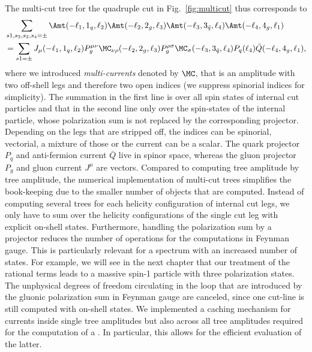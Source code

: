 The multi-cut tree for the quadruple cut in Fig.~\ref{fig:multicut} thus corresponds to 
\begin{align}
\begin{split}
  &\sum_{s1,s_2,s_3,s_4=\pm}\Amt(-\ell_1,1_q,\ell_2)\Amt(-\ell_2,2_g,\ell_3)\Amt(-\ell_3,3_{\bar{q}},\ell_4)\Amt(-\ell_4,4_g,\ell_1)\\
  &=\sum_{s1=\pm}J_\mu(-\ell_1,1_q,\ell_2)P_g^{\mu\nu}\MC_{\nu\rho}(-\ell_2,2_g,\ell_3)P_g^{\rho\sigma}\MC_{\sigma}(-\ell_3,3_{\bar{q}},\ell_4)P_q(\ell_4)\bar{Q}(-\ell_4,4_{g},\ell_1),
\end{split}
\end{align}
where we introduced \textit{multi-currents} denoted by $\MC$, that is an amplitude
with two off-shell legs and therefore two open indices (we suppress spinorial indices for simplicity). The summation
in the first line is over all spin states of internal cut particles and
that in the second line only over the spin-states of the internal
particle, whose polarization sum is not replaced by the
corresponding projector. Depending on
the legs that are stripped off, the indices can be spinorial, vectorial, a
mixture of those or the current can be a scalar. The quark
projector $P_q$ and anti-fermion current $\bar{Q}$ live in spinor
space, whereas the gluon projector $P_g$ and gluon current $J^\mu$ are
vectors. Compared to computing tree amplitude by tree amplitude, the numerical
implementation of multi-cut trees simplifies the
book-keeping due to the smaller number of objects that are computed. Instead
of computing several trees for each helicity configuration of internal
cut legs, we only have to sum over the helicity configurations of the single
cut leg with explicit on-shell states. Furthermore, handling the polarization sum by a
projector reduces the number of operations for the computations in Feynman
gauge. This is particularly relevant for a spectrum with an increased number of
states. For example, we will see in the next chapter that our treatment of the
rational terms leads to a massive spin-1 particle with three
polarization states. The unphysical
degrees of freedom circulating in the loop that are introduced by the gluonic polarization sum in
Feynman gauge are canceled, since one cut-line is still computed with
on-shell states. We implemented a caching
mechanism for currents inside single tree amplitudes but also across
all tree amplitudes required for the computation of a \ola. In
particular, this allows for the efficient evaluation of the latter.
